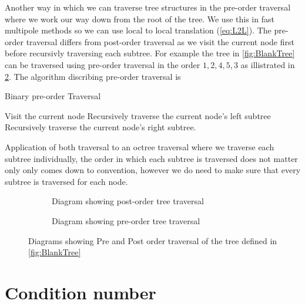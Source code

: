 Another way in which we can traverse tree structures in the pre-order traversal where we work our way down from the root of the tree. We use this in fast multipole methods so we can use local to local translation (\cref{eq:L2L}). The pre-order traversal differs from post-order traversal as we visit the current node first before recursivly traversing each subtree. For example the tree in \cref{fig:BlankTree} can be traversed using pre-order traversal in the order $1, 2, 4, 5, 3$ as illistrated in \cref{fig:Preorder}. The algorithm discribing pre-order traversal is
\begin{algorithm}
\caption{Binary pre-order Traversal}
\begin{algorithmic}[1]
\State Visit the current node
\State Recursively traverse the current node's left subtree
\State Recursively traverse the current node's right subtree.
\end{algorithmic}
\end{algorithm}

Application of both traversal to an octree traversal where we traverse each subtree individually, the order in which each subtree is traversed does not matter only only comes down to convention, however we do need to make sure that every subtree is traversed for each node.


\begin{figure}
     \centering
     \begin{subfigure}[b]{0.45\textwidth}
         \centering
         \resizebox{\linewidth}{!}{}
         \caption{Diagram showing post-order tree traversal}
         \label{fig:Postorder}
     \end{subfigure}
          \hfill
     \begin{subfigure}[b]{0.45\textwidth}
         \centering
         \resizebox{\linewidth}{!}{}
         \caption{Diagram showing pre-order tree traversal}
         \label{fig:Preorder}
     \end{subfigure}
        \caption{Diagrams showing Pre and Post order traversal of the tree defined in \cref{fig:BlankTree}}
        \label{fig:TreeTraversal}
\end{figure}




\section{Condition number}\label{appendix:ConNum}


